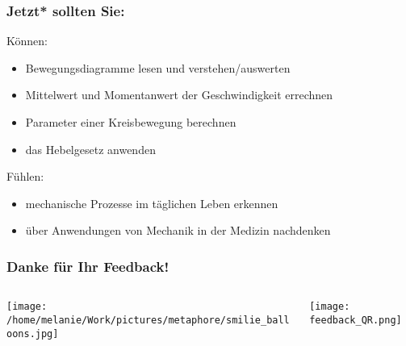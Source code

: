 \documentclass{beamer}
\begin{document}
\begin{frame}

\frametitle{Jetzt* sollten Sie:}
 



\begin{block}{Können:}
\begin{itemize}
\item
Bewegungsdiagramme lesen und verstehen/auswerten
\item
Mittelwert und Momentanwert der Geschwindigkeit errechnen
\item
Parameter einer Kreisbewegung berechnen
\item 
das Hebelgesetz anwenden
\end{itemize}
\end{block}


 
\begin{block}{Fühlen:}
\begin{itemize}
\item
mechanische Prozesse im täglichen Leben erkennen
\item
über Anwendungen von Mechanik in der Medizin nachdenken
\end{itemize}
\end{block}

 \end{frame}






\begin{frame}
\frametitle{Danke für Ihr Feedback!}

\begin{columns}[c]

\begin{column}{6cm}
\begin{center}
\texttt{[image: /home/melanie/Work/pictures/metaphore/smilie\_balloons.jpg]}
\end{center}

\end{column}

\begin{column}{4cm}


\begin{center}
\texttt{[image: feedback\_QR.png]}
\end{center}
\end{column}


\end{columns}

\end{frame}
\end{document}
